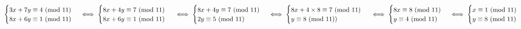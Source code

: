 \documentclass{article}
\begin{document}
		\justify
		\begin{math}
			\begin{cases}
				3x + 7y \equiv 4 \mbox{ (mod 11)}\\
				8x + 6y \equiv 1 \mbox{ (mod 11)}
			\end{cases}
			\iff
			\begin{cases}
				8x + 4y \equiv 7 \mbox{ (mod 11)}\\
				8x + 6y \equiv 1 \mbox{ (mod 11)}
			\end{cases}
			\\\\\\
			\iff
			\begin{cases}
				8x + 4y \equiv 7 \mbox{ (mod 11)}\\
				2y \equiv 5 \mbox{ (mod 11)}
			\end{cases}
			\iff
			\begin{cases}
				8x + 4\times8 \equiv 7 \mbox{ (mod 11)}\\
				y \equiv 8 \mbox{ (mod 11)})
			\end{cases}
			\\\\\\
			\iff
			\begin{cases}
				8x \equiv 8 \mbox{ (mod 11)}\\
				y \equiv 4 \mbox{ (mod 11)}
			\end{cases}
			\iff
			\begin{cases}
				x \equiv 1 \mbox{ (mod 11)}\\
				y \equiv 8 \mbox{ (mod 11)}
			\end{cases}
		\end{math}
	
\end{document}
